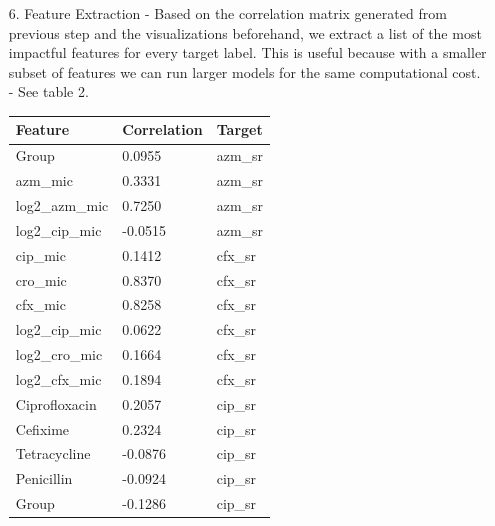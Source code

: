 \documentclass[manuscript,screen,review, nonacm]{acmart}
\begin{document}
\begin{itemize}
    \item[6.] Feature Extraction - Based on the correlation matrix generated from previous step and the visualizations beforehand, we extract a list of the most
    impactful features for every target label. This is useful because with a smaller subset of features we can run larger models for the same computational cost. - See table 2.
            \begin{table}[H]
                \centering
                \begin{tabular}{|l|l|l|}
                \hline
                \textbf{Feature}           & \textbf{Correlation} & \textbf{Target} \\ \hline
                Group                      & 0.0955               & azm\_sr         \\ \hline
                azm\_mic                   & 0.3331               & azm\_sr         \\ \hline
                log2\_azm\_mic             & 0.7250               & azm\_sr         \\ \hline
                log2\_cip\_mic             & -0.0515              & azm\_sr         \\ \hline
                cip\_mic                   & 0.1412               & cfx\_sr         \\ \hline
                cro\_mic                   & 0.8370               & cfx\_sr         \\ \hline
                cfx\_mic                   & 0.8258               & cfx\_sr         \\ \hline
                log2\_cip\_mic             & 0.0622               & cfx\_sr         \\ \hline
                log2\_cro\_mic             & 0.1664               & cfx\_sr         \\ \hline
                log2\_cfx\_mic             & 0.1894               & cfx\_sr         \\ \hline
                Ciprofloxacin              & 0.2057               & cip\_sr         \\ \hline
                Cefixime                   & 0.2324               & cip\_sr         \\ \hline
                Tetracycline               & -0.0876              & cip\_sr         \\ \hline
                Penicillin                 & -0.0924              & cip\_sr         \\ \hline
                Group                      & -0.1286              & cip\_sr         \\ \hline

\end{tabular}
\end{table}
\end{itemize}
\end{document}
